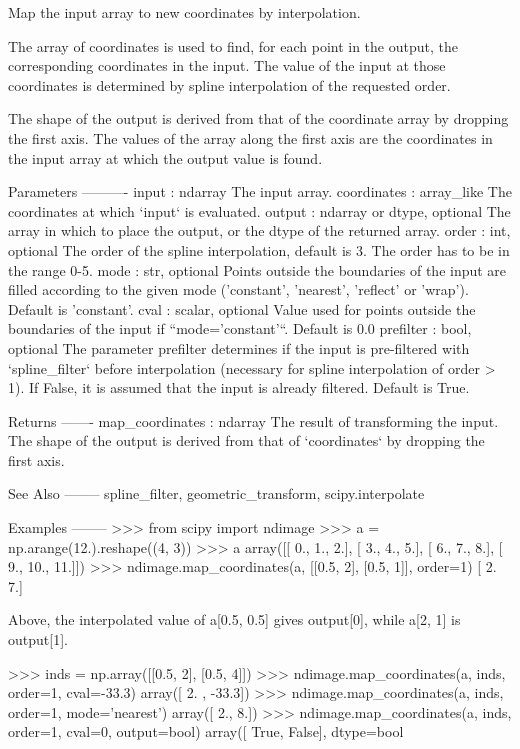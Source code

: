 \begin{DoxyVerb}Map the input array to new coordinates by interpolation.

The array of coordinates is used to find, for each point in the output,
the corresponding coordinates in the input. The value of the input at
those coordinates is determined by spline interpolation of the
requested order.

The shape of the output is derived from that of the coordinate
array by dropping the first axis. The values of the array along
the first axis are the coordinates in the input array at which the
output value is found.

Parameters
----------
input : ndarray
    The input array.
coordinates : array_like
    The coordinates at which `input` is evaluated.
output : ndarray or dtype, optional
    The array in which to place the output, or the dtype of the returned
    array.
order : int, optional
    The order of the spline interpolation, default is 3.
    The order has to be in the range 0-5.
mode : str, optional
    Points outside the boundaries of the input are filled according
    to the given mode ('constant', 'nearest', 'reflect' or 'wrap').
    Default is 'constant'.
cval : scalar, optional
    Value used for points outside the boundaries of the input if
    ``mode='constant'``. Default is 0.0
prefilter : bool, optional
    The parameter prefilter determines if the input is pre-filtered with
    `spline_filter` before interpolation (necessary for spline
    interpolation of order > 1).  If False, it is assumed that the input is
    already filtered. Default is True.

Returns
-------
map_coordinates : ndarray
    The result of transforming the input. The shape of the output is
    derived from that of `coordinates` by dropping the first axis.

See Also
--------
spline_filter, geometric_transform, scipy.interpolate

Examples
--------
>>> from scipy import ndimage
>>> a = np.arange(12.).reshape((4, 3))
>>> a
array([[  0.,   1.,   2.],
       [  3.,   4.,   5.],
       [  6.,   7.,   8.],
       [  9.,  10.,  11.]])
>>> ndimage.map_coordinates(a, [[0.5, 2], [0.5, 1]], order=1)
[ 2.  7.]

Above, the interpolated value of a[0.5, 0.5] gives output[0], while
a[2, 1] is output[1].

>>> inds = np.array([[0.5, 2], [0.5, 4]])
>>> ndimage.map_coordinates(a, inds, order=1, cval=-33.3)
array([  2. , -33.3])
>>> ndimage.map_coordinates(a, inds, order=1, mode='nearest')
array([ 2.,  8.])
>>> ndimage.map_coordinates(a, inds, order=1, cval=0, output=bool)
array([ True, False], dtype=bool\end{DoxyVerb}
 \hypertarget{namespacescipy_1_1ndimage_1_1interpolation_abb9f8f94c0fd801436c15c06c65c2a81}{}
